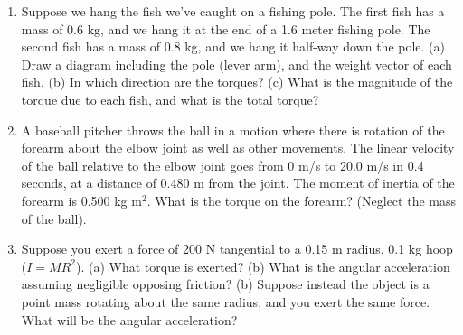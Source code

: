 \documentclass[10pt]{article}
\begin{document}
\begin{enumerate}
\item Suppose we hang the fish we've caught on a fishing pole.  The first fish has a mass of 0.6 kg, and we hang it at the end of a 1.6 meter fishing pole.  The second fish has a mass of 0.8 kg, and we hang it half-way down the pole.  (a) Draw a diagram including the pole (lever arm), and the weight vector of each fish.  (b) In which direction are the torques?  (c) What is the magnitude of the torque due to each fish, and what is the total torque? \\ \vspace{2.5cm}
\item  A baseball pitcher throws the ball in a motion where there is rotation of the forearm about the elbow joint as well as other movements.  The linear velocity of the ball relative to the elbow joint goes from 0 m/s to 20.0 m/s in 0.4 seconds, at a distance of 0.480 m from the joint.  The moment of inertia of the forearm is 0.500 kg m$^2$.  What is the torque on the forearm?  (Neglect the mass of the ball).  \\ \vspace{2.5cm}
\item Suppose you exert a force of 200 N tangential to a 0.15 m radius, 0.1 kg hoop ($I = MR^2$).  (a) What torque is exerted? (b) What is the angular acceleration assuming negligible opposing friction? (b) Suppose instead the object is a point mass rotating about the same radius, and you exert the same force.  What will be the angular acceleration? \\ \vspace{2cm}
\end{enumerate}
\end{document}

